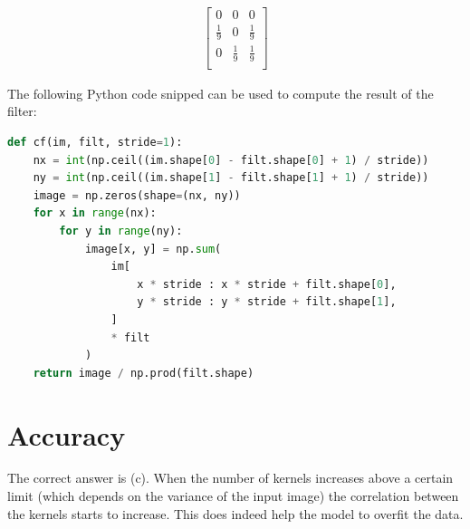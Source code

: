 \documentclass[a4paper]{article}
\begin{document}
\begin{align}
\begin{bmatrix}
     0              & 0             & 0             \\
     \frac{1}{9}    & 0             & \frac{1}{9}   \\
     0              & \frac{1}{9}   & \frac{1}{9}   \\
 \end{bmatrix}
 \label{mat:ans}
\end{align}

The following Python code snipped can be used to compute the result of the filter:

\begin{lstlisting}[language=Python]
def cf(im, filt, stride=1):
    nx = int(np.ceil((im.shape[0] - filt.shape[0] + 1) / stride))
    ny = int(np.ceil((im.shape[1] - filt.shape[1] + 1) / stride))
    image = np.zeros(shape=(nx, ny))
    for x in range(nx):
        for y in range(ny):
            image[x, y] = np.sum(
                im[
                    x * stride : x * stride + filt.shape[0],
                    y * stride : y * stride + filt.shape[1],
                ]
                * filt
            )
    return image / np.prod(filt.shape)
\end{lstlisting}


\section{Accuracy}
The correct answer is (c). When the number of kernels increases above a certain limit (which depends on the variance of the input image) the correlation between the kernels starts to increase. This does indeed help the model to overfit the data.

% 
\end{document}

